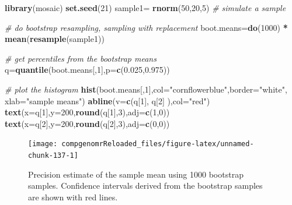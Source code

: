 \documentclass[12pt,]{krantz}
\newenvironment{Shaded}{\begin{snugshade}}{\end{snugshade}}
\newcommand{\CommentTok}[1]{\textcolor[rgb]{0.56,0.35,0.01}{\textit{#1}}}
\newcommand{\DataTypeTok}[1]{\textcolor[rgb]{0.13,0.29,0.53}{#1}}
\newcommand{\DecValTok}[1]{\textcolor[rgb]{0.00,0.00,0.81}{#1}}
\newcommand{\FloatTok}[1]{\textcolor[rgb]{0.00,0.00,0.81}{#1}}
\newcommand{\KeywordTok}[1]{\textcolor[rgb]{0.13,0.29,0.53}{\textbf{#1}}}
\newcommand{\NormalTok}[1]{#1}
\newcommand{\OperatorTok}[1]{\textcolor[rgb]{0.81,0.36,0.00}{\textbf{#1}}}
\newcommand{\StringTok}[1]{\textcolor[rgb]{0.31,0.60,0.02}{#1}}
\begin{document}
\begin{Shaded}
\begin{Highlighting}[]
\KeywordTok{library}\NormalTok{(mosaic)}
\KeywordTok{set.seed}\NormalTok{(}\DecValTok{21}\NormalTok{)}
\NormalTok{sample1=}\StringTok{ }\KeywordTok{rnorm}\NormalTok{(}\DecValTok{50}\NormalTok{,}\DecValTok{20}\NormalTok{,}\DecValTok{5}\NormalTok{) }\CommentTok{# simulate a sample}

\CommentTok{# do bootstrap resampling, sampling with replacement}
\NormalTok{boot.means=}\KeywordTok{do}\NormalTok{(}\DecValTok{1000}\NormalTok{) }\OperatorTok{*}\StringTok{ }\KeywordTok{mean}\NormalTok{(}\KeywordTok{resample}\NormalTok{(sample1))}

\CommentTok{# get percentiles from the bootstrap means}
\NormalTok{q=}\KeywordTok{quantile}\NormalTok{(boot.means[,}\DecValTok{1}\NormalTok{],}\DataTypeTok{p=}\KeywordTok{c}\NormalTok{(}\FloatTok{0.025}\NormalTok{,}\FloatTok{0.975}\NormalTok{))}

\CommentTok{# plot the histogram}
\KeywordTok{hist}\NormalTok{(boot.means[,}\DecValTok{1}\NormalTok{],}\DataTypeTok{col=}\StringTok{"cornflowerblue"}\NormalTok{,}\DataTypeTok{border=}\StringTok{"white"}\NormalTok{,}
                    \DataTypeTok{xlab=}\StringTok{"sample means"}\NormalTok{)}
\KeywordTok{abline}\NormalTok{(}\DataTypeTok{v=}\KeywordTok{c}\NormalTok{(q[}\DecValTok{1}\NormalTok{], q[}\DecValTok{2}\NormalTok{] ),}\DataTypeTok{col=}\StringTok{"red"}\NormalTok{)}
\KeywordTok{text}\NormalTok{(}\DataTypeTok{x=}\NormalTok{q[}\DecValTok{1}\NormalTok{],}\DataTypeTok{y=}\DecValTok{200}\NormalTok{,}\KeywordTok{round}\NormalTok{(q[}\DecValTok{1}\NormalTok{],}\DecValTok{3}\NormalTok{),}\DataTypeTok{adj=}\KeywordTok{c}\NormalTok{(}\DecValTok{1}\NormalTok{,}\DecValTok{0}\NormalTok{))}
\KeywordTok{text}\NormalTok{(}\DataTypeTok{x=}\NormalTok{q[}\DecValTok{2}\NormalTok{],}\DataTypeTok{y=}\DecValTok{200}\NormalTok{,}\KeywordTok{round}\NormalTok{(q[}\DecValTok{2}\NormalTok{],}\DecValTok{3}\NormalTok{),}\DataTypeTok{adj=}\KeywordTok{c}\NormalTok{(}\DecValTok{0}\NormalTok{,}\DecValTok{0}\NormalTok{))}
\end{Highlighting}
\end{Shaded}

\begin{figure}

{\centering \texttt{[image: compgenomrReloaded\_files/figure-latex/unnamed-chunk-137-1]} 

}

\caption{Precision estimate of the sample mean using 1000 bootstrap samples. Confidence intervals derived from the bootstrap samples are shown with red lines.}\label{fig:unnamed-chunk-137}
\end{figure}
\end{document}
